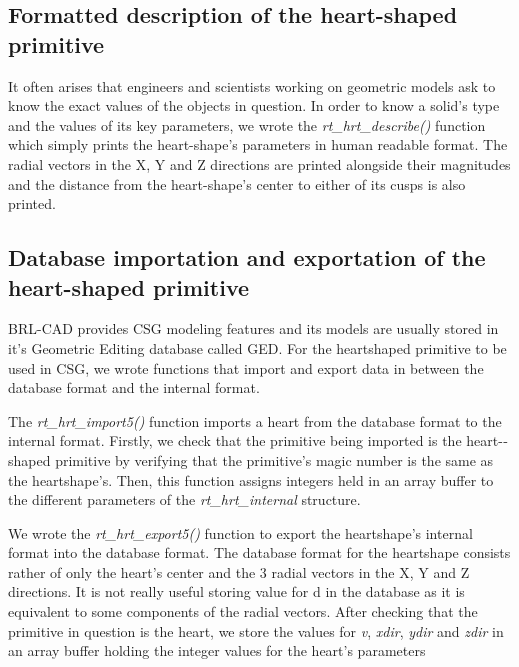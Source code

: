\subsection{Formatted description of the heart­-shaped primitive}

\hspace{30} It   often   arises   that   engineers   and   scientists   working   on   geometric   models  
ask   to   know   the   exact   values   of   the   objects   in   question.   In   order   to   know   a  
solid's   type   and   the   values   of   its   key   parameters,   we   wrote   the   \textit{rt\_hrt\_describe()}  
function   which   simply   prints   the   heart-shape's   parameters   in   human   readable   format.  
The   radial   vectors   in   the   X,   Y   and   Z   directions   are   printed   alongside   their  
magnitudes   and   the   distance   from   the   heart-shape's   center   to   either   of   its   cusps   is  
also printed.

\subsection{Database importation and exportation of the heart­-shaped primitive}

\hspace{30} BRL-­CAD   provides   CSG   modeling   features   and   its   models   are   usually  
stored   in   it's   Geometric   Editing   database   called   GED.   For   the   heart­shaped  
primitive   to   be   used   in   CSG,   we   wrote   functions   that  
import and export data in between the database format and the internal format. 
  
The   \textit{rt\_hrt\_import5()}   function   imports   a   heart   from   the   database   format   to   the  
internal   format.   Firstly,   we   check   that   the   primitive   being   imported   is   the  
heart-­shaped   primitive   by   verifying   that   the   primitive's   magic   number   is   the  
same   as   the   heart­shape's.   Then,   this   function   assigns   integers   held   in   an   array  
buffer to the different parameters of the \textit{rt\_hrt\_internal} structure.
   
We   wrote   the   \textit{rt\_hrt\_export5()}   function   to   export   the   heart­shape's   internal  
format   into   the   database   format.   The   database   format   for   the   heart­shape  
consists   rather   of   only   the   heart's   center   and   the   3   radial   vectors   in   the   X,   Y   and  
Z   directions.   It   is   not   really   useful   storing   value   for   d   in   the   database   as   it   is  
equivalent   to   some   components   of   the   radial   vectors.   After   checking   that   the  
primitive   in   question   is   the   heart,   we   store   the   values   for   \textit{v},   \textit{xdir},   \textit{ydir}   and   \textit{zdir} in an array buffer holding the integer values for the heart's parameters

